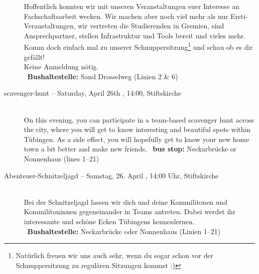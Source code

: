 \begin{description}
        Hoffentlich konnten wir mit unseren Veranstaltungen euer Interesse an Fachschaftsarbeit wecken.
        Wir machen aber noch viel mehr als nur Ersti-Veranstaltungen, wir vertreten die Studierenden in Gremien,
        sind Ansprechpartner, stellen Infrastruktur und Tools bereit und vieles mehr.
        Komm doch einfach mal zu unserer Schnuppersitzung\footnote{Natürlich freuen wir uns auch sehr, wenn du sogar schon vor der Schnuppersitzung zu regulären Sitzungen kommst :)}
        und schau ob es dir gefällt!\\
        Keine Anmeldung nötig.\\
        ~\textbf{Bushaltestelle:} Sand Drosselweg (Linien 2 \& 6)
    \fi
\fi

 \ifml
     \item[scavenger-hunt -- Saturday, April 26th \YEAR, 14:00, Stiftskirche]~\\
     On this evening, you can participate in a team-based scavenger hunt across the city,
     where you will get to know interesting and beautiful spots within Tübingen.
     As a side effect, you will hopefully get to know your new home town a bit better and make new friends.
   ~\textbf{bus stop:} Neckarbrücke or Nonnenhaus (lines 1--21)
 \else
     \item[Abenteuer-Schnitzeljagd -- Samstag, 26. April \YEAR, 14:00 Uhr, Stiftskirche]~\\
     Bei der Schnitzeljagd lassen wir dich und deine Kommilitonen und Kommilitoninnen gegeneinander in Teams antreten.
     Dabei werdet ihr interessante und schöne Ecken Tübingens kennenlernen.\\
   ~\textbf{Bushaltestelle:} Neckarbrücke oder Nonnenhaus (Linien 1--21)
 \fi




\end{description}
